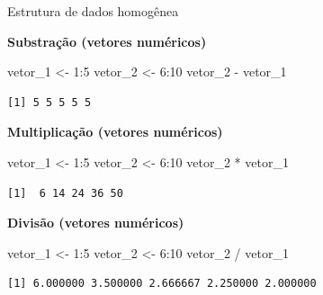 \documentclass[
  10pt,
  ignorenonframetext,
]{beamer}
\newenvironment{Shaded}{\begin{snugshade}}{\end{snugshade}}
\newcommand{\DecValTok}[1]{\textcolor[rgb]{0.68,0.00,0.00}{#1}}
\newcommand{\NormalTok}[1]{\textcolor[rgb]{0.00,0.23,0.31}{#1}}
\newcommand{\OtherTok}[1]{\textcolor[rgb]{0.00,0.23,0.31}{#1}}
\newcommand{\SpecialCharTok}[1]{\textcolor[rgb]{0.37,0.37,0.37}{#1}}
\begin{document}
\begin{frame}[fragile]{Estrutura de dados homogênea}
\protect\hypertarget{estrutura-de-dados-homoguxeanea-5}{}
\small

\textbf{Substração (vetores numéricos)}

\begin{Shaded}
\begin{Highlighting}[]
\NormalTok{vetor\_1 }\OtherTok{\textless{}{-}} \DecValTok{1}\SpecialCharTok{:}\DecValTok{5}
\NormalTok{vetor\_2 }\OtherTok{\textless{}{-}} \DecValTok{6}\SpecialCharTok{:}\DecValTok{10}
\NormalTok{vetor\_2 }\SpecialCharTok{{-}}\NormalTok{ vetor\_1}
\end{Highlighting}
\end{Shaded}

\begin{verbatim}
[1] 5 5 5 5 5
\end{verbatim}

\textbf{Multiplicação (vetores numéricos)}

\begin{Shaded}
\begin{Highlighting}[]
\NormalTok{vetor\_1 }\OtherTok{\textless{}{-}} \DecValTok{1}\SpecialCharTok{:}\DecValTok{5}
\NormalTok{vetor\_2 }\OtherTok{\textless{}{-}} \DecValTok{6}\SpecialCharTok{:}\DecValTok{10}
\NormalTok{vetor\_2 }\SpecialCharTok{*}\NormalTok{ vetor\_1}
\end{Highlighting}
\end{Shaded}

\begin{verbatim}
[1]  6 14 24 36 50
\end{verbatim}

\textbf{Divisão (vetores numéricos)}

\begin{Shaded}
\begin{Highlighting}[]
\NormalTok{vetor\_1 }\OtherTok{\textless{}{-}} \DecValTok{1}\SpecialCharTok{:}\DecValTok{5}
\NormalTok{vetor\_2 }\OtherTok{\textless{}{-}} \DecValTok{6}\SpecialCharTok{:}\DecValTok{10}
\NormalTok{vetor\_2 }\SpecialCharTok{/}\NormalTok{ vetor\_1}
\end{Highlighting}
\end{Shaded}

\begin{verbatim}
[1] 6.000000 3.500000 2.666667 2.250000 2.000000
\end{verbatim}

\normalsize
\end{frame}
\end{document}
